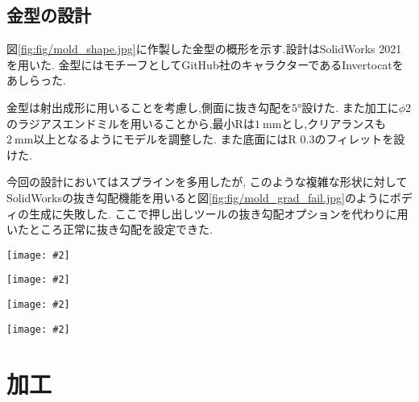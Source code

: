 \documentclass[uplatex,a4j,11pt,dvipdfmx]{jsreport}
\makeatletter
\def\fgcaption{\def\@captype{figure}\caption}
\newcommand{\mfig}[3][width=15cm]{
\begin{center}
\texttt{[image: \#2]}
\fgcaption{#3 \label{fig:#2}}
\end{center}
}
\makeatother
\begin{document}
  \section{金型の設計}
  図\ref{fig:fig/mold_shape.jpg}に作製した金型の概形を示す.設計はSolidWorks 2021を用いた.
  金型にはモチーフとしてGitHub社のキャラクターであるInvertocatをあしらった.\cite{octocat,octocat_legal}

  金型は射出成形に用いることを考慮し,側面に抜き勾配を$5\si{\degree}$設けた.
  また加工に$\phi 2$のラジアスエンドミルを用いることから,最小Rは$1\ \si{\milli\metre}$とし,クリアランスも$2\ \si{\milli\metre}$以上となるようにモデルを調整した.
  また底面にはR 0.3のフィレットを設けた.

  今回の設計においてはスプラインを多用したが,
  このような複雑な形状に対してSolidWorksの抜き勾配機能を用いると図\ref{fig:fig/mold_grad_fail.jpg}のようにボディの生成に失敗した.
  ここで押し出しツールの抜き勾配オプションを代わりに用いたところ正常に抜き勾配を設定できた.
  \mfig[width=12cm]{fig/mold_shape.jpg}{金型の概形}
  \mfig[width=8cm]{fig/mold_grad.jpg}{金型の抜き勾配,底面のフィレット}
  \mfig[width=8cm]{fig/mold_clear.jpg}{金型の最小クリアランス,最小R}
  \mfig[width=12cm]{fig/mold_grad_fail.jpg}{抜き勾配ツールを用いた時のボディ,サーフェスが大量に生成され,不整合な状態になっている}
  \chapter{加工}
\end{document}
